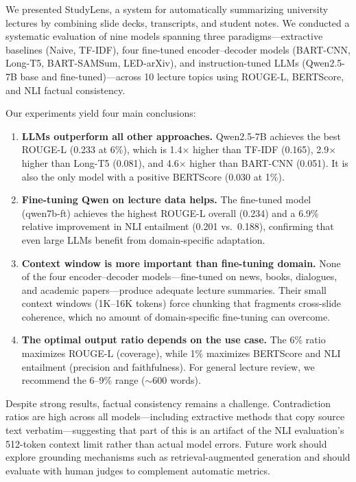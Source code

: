 We presented StudyLens, a system for automatically summarizing university lectures by combining slide decks, transcripts, and student notes. We conducted a systematic evaluation of nine models spanning three paradigms---extractive baselines (Naive, TF-IDF), four fine-tuned encoder--decoder models (BART-CNN, Long-T5, BART-SAMSum, LED-arXiv), and instruction-tuned LLMs (Qwen2.5-7B base and fine-tuned)---across 10 lecture topics using ROUGE-L, BERTScore, and NLI factual consistency.

Our experiments yield four main conclusions:
\begin{enumerate}
    \item \textbf{LLMs outperform all other approaches.} Qwen2.5-7B achieves the best ROUGE-L (0.233 at 6\%), which is 1.4$\times$ higher than TF-IDF (0.165), 2.9$\times$ higher than Long-T5 (0.081), and 4.6$\times$ higher than BART-CNN (0.051). It is also the only model with a positive BERTScore (0.030 at 1\%).
    \item \textbf{Fine-tuning Qwen on lecture data helps.} The fine-tuned model (qwen7b-ft) achieves the highest ROUGE-L overall (0.234) and a 6.9\% relative improvement in NLI entailment (0.201 vs.\ 0.188), confirming that even large LLMs benefit from domain-specific adaptation.
    \item \textbf{Context window is more important than fine-tuning domain.} None of the four encoder--decoder models---fine-tuned on news, books, dialogues, and academic papers---produce adequate lecture summaries. Their small context windows (1K--16K tokens) force chunking that fragments cross-slide coherence, which no amount of domain-specific fine-tuning can overcome.
    \item \textbf{The optimal output ratio depends on the use case.} The 6\% ratio maximizes ROUGE-L (coverage), while 1\% maximizes BERTScore and NLI entailment (precision and faithfulness). For general lecture review, we recommend the 6--9\% range ($\sim$600 words).
\end{enumerate}

Despite strong results, factual consistency remains a challenge. Contradiction ratios are high across all models---including extractive methods that copy source text verbatim---suggesting that part of this is an artifact of the NLI evaluation's 512-token context limit rather than actual model errors. Future work should explore grounding mechanisms such as retrieval-augmented generation and should evaluate with human judges to complement automatic metrics.

